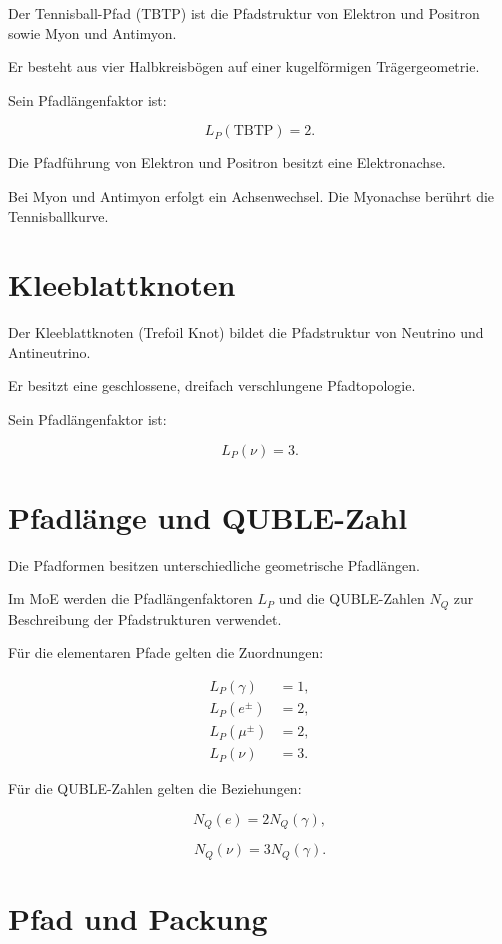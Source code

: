 \documentclass[11pt,a4paper]{article}
\begin{document}
Der Tennisball-Pfad (TBTP)
ist die Pfadstruktur von
Elektron und Positron sowie
Myon und Antimyon.

Er besteht aus vier
Halbkreisbögen auf einer
kugelförmigen Trägergeometrie.

Sein Pfadlängenfaktor ist:

\[
L_P(\mathrm{TBTP})=2.
\]

Die Pfadführung von Elektron
und Positron besitzt eine
Elektronachse.

Bei Myon und Antimyon
erfolgt ein Achsenwechsel.
Die Myonachse berührt die
Tennisballkurve.

\section*{Kleeblattknoten}

Der Kleeblattknoten
(Trefoil Knot) bildet die
Pfadstruktur von Neutrino
und Antineutrino.

Er besitzt eine geschlossene,
dreifach verschlungene
Pfadtopologie.

Sein Pfadlängenfaktor ist:

\[
L_P(\nu)=3.
\]

\section*{Pfadlänge und QUBLE-Zahl}

Die Pfadformen besitzen
unterschiedliche geometrische
Pfadlängen.

Im MoE werden die
Pfadlängenfaktoren
$L_P$ und die QUBLE-Zahlen
$N_Q$ zur Beschreibung der
Pfadstrukturen verwendet.

Für die elementaren Pfade
gelten die Zuordnungen:

\[
\begin{aligned}
L_P(\gamma) &= 1,\\
L_P(e^\pm) &= 2,\\
L_P(\mu^\pm) &= 2,\\
L_P(\nu) &= 3.
\end{aligned}
\]

Für die QUBLE-Zahlen
gelten die Beziehungen:

\[
N_Q(e)=2N_Q(\gamma),
\]

\[
N_Q(\nu)=3N_Q(\gamma).
\]

\section*{Pfad und Packung}
\end{document}
